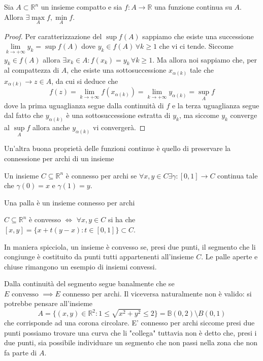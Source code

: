 \begin{theorem}
Sia $A \subset \mathbb{R}^n$ un insieme compatto e sia $f: A \to \mathbb{R}$ una funzione continua su $A$. Allora $\exists \max\limits_A{f}, \min\limits_A{f}$. 
\label{thm:weierstrass}
\end{theorem}
\begin{proof}
Per caratterizzazione del $\sup{f(A)}$ sappiamo che esiste una successione $\lim\limits_{k \to +\infty} y_k = \sup f(A)$ dove $y_k \in f(A) \, \forall k \geq 1$ che vi ci tende. Siccome $y_k \in f(A)$ allora $\exists x_k \in A: f(x_k) = y_k \, \forall k \geq 1$. Ma allora noi sappiamo che, per al compattezza di $A$, che esiste una sottosuccessione $x_{\alpha (k)}$ tale che $x_{\alpha(k)} \to z \in A$, da cui si deduce che
$$
f(z) = \lim_{k \to +\infty} f(x_{\alpha(k)}) = \lim_{k \to +\infty} y_{\alpha(k)} = \sup_A{f}
$$
dove la prima uguaglianza segue dalla continuità di $f$ e la terza uguaglianza segue dal fatto che $y_{\alpha(k)}$ è una sottosuccessione estratta di $y_k$, ma siccome $y_k$ converge al $\sup\limits_A{f}$ allora anche $y_{\alpha(k)}$ vi convergerà.
\end{proof}
Un'altra buona proprietà delle funzioni continue è quello di preservare la connessione per archi di un insieme
\begin{definition}
	Un insieme $C \subseteq \mathbb{R}^n$ è connesso per archi se $\forall x, y \in C \exists \gamma: [0, 1] \to C$ continua tale che $\gamma(0) = x$ e $\gamma(1) = y$.
\end{definition}
\begin{example}
	Una palla è un insieme connesso per archi
\end{example}
\begin{definition}
	$C \subseteq \mathbb{R}^n$ è convesso $\iff \, \, \forall x, y \in C$ si ha che $[x, y] = \{ x + t(y-x) : t \in [0, 1] \} \subset C$.
\end{definition}
\begin{remark}
	In maniera spicciola, un insieme è convesso se, presi due punti, il segmento che li congiunge è costituito da punti tutti appartenenti all'insieme $C$. Le palle aperte e chiuse rimangono un esempio di insiemi convessi.
\end{remark}
\begin{remark}
	Dalla continuità del segmento segue banalmente che se $E \text{ convesso } \implies E \text{ connesso per archi}$. Il viceversa naturalmente non è valido: si potrebbe pensare all'insieme 
	$$
	A = \{(x, y) \in \mathbb{R}^2 : 1 \leq \sqrt{x^2 + y^2} \leq 2 \} = \mathbb{B}(0, 2) \setminus B(0,1)
	$$
	che corrisponde ad una corona circolare. E' connesso per archi siccome presi due punti possiamo trovare una curva che li "collega" tuttavia non è detto che, presi i due punti, sia possibile individuare un segmento che non passi nella zona che non fa parte di $A$.
\end{remark}

